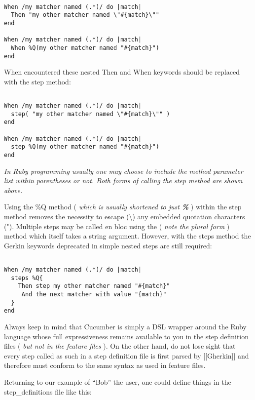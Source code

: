 \begin{verbatim}

When /my matcher named (.*)/ do |match|
  Then "my other matcher named \"#{match}\""
end

When /my matcher named (.*)/ do |match|
  When %Q(my other matcher named "#{match}")
end

\end{verbatim}
When encountered these nested Then and When keywords should be replaced with the step method:

\begin{verbatim}

When /my matcher named (.*)/ do |match|
  step( "my other matcher named \"#{match}\"" )
end

When /my matcher named (.*)/ do |match|
  step %Q(my other matcher named "#{match}")
end

\end{verbatim}
\emph{In Ruby programming usually one may choose to include the method parameter list within parentheses or not.  Both forms of calling the step method are shown above.}

Using the \%Q method ( \emph{which is usually shortened to just \textbf{\%}} ) within the step method removes the necessity to escape (\textbackslash{}) any embedded quotation characters (").  Multiple steps may be called en bloc using the \textbf{\verb@steps@} ( \emph{note the plural form} ) method which itself takes a string argument.  However, with the steps method the Gerkin keywords deprecated in simple nested steps are still required:
\begin{verbatim}

When /my matcher named (.*)/ do |match|
  steps %Q{
    Then step my other matcher named "#{match}" 
     And the next matcher with value "{match}"
  }
end

\end{verbatim}

Always keep in mind that Cucumber is simply a DSL wrapper around the Ruby language whose full expressiveness remains available to you in the step definition files ( \emph{but not in the feature files} ).  On the other hand, do not lose sight that every step called as such in a step definition file is first parsed by [[Gherkin]] and therefore must conform to the same syntax as used in feature files.

Returning to our example of ``Bob'' the user, one could define things in the step\_definitions file like this:

